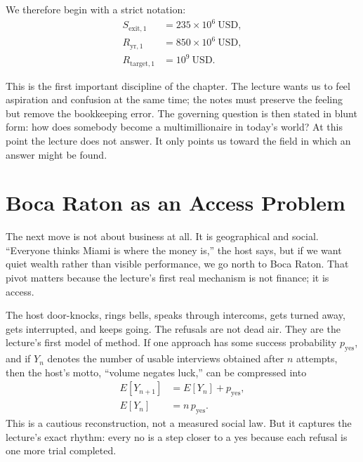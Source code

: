 We therefore begin with a strict notation:
\begin{align}
S_{\mathrm{exit},1} &= 235\times 10^{6}\ \mathrm{USD},\\
R_{\mathrm{yr},1} &= 850\times 10^{6}\ \mathrm{USD},\\
R_{\mathrm{target},1} &= 10^{9}\ \mathrm{USD}.
\end{align}

This is the first important discipline of the chapter. The lecture wants us to feel aspiration and confusion at the same time; the notes must preserve the feeling but remove the bookkeeping error. The governing question is then stated in blunt form: how does somebody become a multimillionaire in today's world? At this point the lecture does not answer. It only points us toward the field in which an answer might be found.

\section{Boca Raton as an Access Problem}

The next move is not about business at all. It is geographical and social. ``Everyone thinks Miami is where the money is,'' the host says, but if we want quiet wealth rather than visible performance, we go north to Boca Raton. That pivot matters because the lecture's first real mechanism is not finance; it is access.

The host door-knocks, rings bells, speaks through intercoms, gets turned away, gets interrupted, and keeps going. The refusals are not dead air. They are the lecture's first model of method. If one approach has some success probability \(p_{\mathrm{yes}}\), and if \(Y_n\) denotes the number of usable interviews obtained after \(n\) attempts, then the host's motto, ``volume negates luck,'' can be compressed into
\begin{align}
E[Y_{n+1}] &= E[Y_n] + p_{\mathrm{yes}},\\
E[Y_n] &= n\,p_{\mathrm{yes}}.
\end{align}
This is a cautious reconstruction, not a measured social law. But it captures the lecture's exact rhythm: every no is a step closer to a yes because each refusal is one more trial completed.

